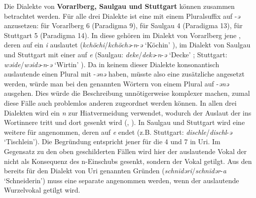 Die Dialekte von \textbf{Vorarlberg, Saulgau und Stuttgart} können zusammen betrachtet werden. Für alle drei Dialekte ist eine  mit einem Pluralsuffix auf -\textit{ə} anzusetzen: für Vorarlberg  6 (Paradigma 9), für Saulgau  4 (Paradigma 13), für Stuttgart  5 (Paradigma 14). In diese  gehören im Dialekt von Vorarlberg jene , deren  auf ein \textit{i} auslautet (\textit{kchöchi}/\textit{kchöchə}-\textit{n}-\textit{ə} ‘Köchin’ \citealt[252-253]{Jutz1925}), im Dialekt von Saulgau und Stuttgart  mit einer  auf \textit{e} (Saulgau: \textit{deke}/\textit{dekə}-\textit{n}-\textit{ə} ‘Decke’ \citep[105]{Raichle1932}; Stuttgart: \textit{wəide}/\textit{wəidə}-\textit{n}-\textit{ə} ‘Wirtin’ \citep[151]{Frey1975}). Da in keinem dieser Dialekte konsonantisch auslautende  einen Plural mit -\textit{ənə} haben, müsste also eine zusätzliche  angesetzt werden, würde man bei den genannten Wörtern von einem Plural auf -\textit{ənə} ausgehen. Dies würde die Beschreibung unnötigerweise komplexer machen, zumal diese Fälle auch problemlos anderen  zugeordnet werden können. In allen drei Dialekten wird ein \textit{n} zur Hiatvermeidung verwendet, wodurch der Auslaut der  ins Wortinnere tritt und dort gesenkt wird (\citealt[175]{Jutz1925}, \citealt[64]{Raichle1932}). In Saulgau und Stuttgart wird eine weitere  für  angenommen, deren  auf \textit{e} endet (z.B. Stuttgart: \textit{dischle}/\textit{dischl}-\textit{ə} ‘Tischlein’). Die Begründung entspricht jener für die  4 und 7 in Uri. Im Gegensatz zu den oben geschilderten Fällen wird hier der auslautende Vokal der  nicht als Konsequenz des n-Einschubs gesenkt, sondern der Vokal getilgt. Aus den bereits für den Dialekt von Uri genannten Gründen (\textit{schn\=idəri}/\textit{schn\=idər}-\textit{a} ‘Schneiderin’) muss eine separate  angenommen werden, wenn der auslautende Wurzelvokal getilgt wird.

